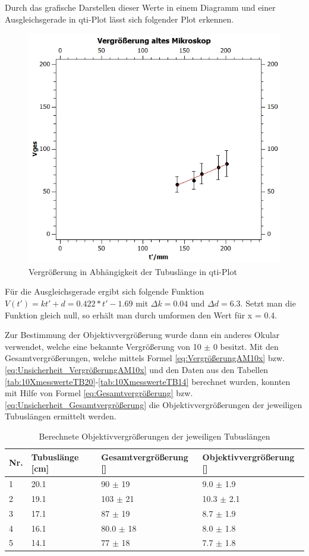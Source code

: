 \documentclass[12pt,a4paper,twoside]{article}
\begin{document}
\noindent
Durch das grafische Darstellen dieser Werte in einem Diagramm und einer Ausgleichsgerade in qti-Plot lässt sich folgender Plot erkennen.

\begin{figure}[H]
    \centering
    \includegraphics[width=0.6\linewidth, angle=0]{nudes/VergrößerungAltesMik.jpg}
    \caption{Vergrößerung in Abhängigkeit der Tubuslänge in qti-Plot}
    \label{fig:VergrößerungDiagramm}
\end{figure}

\noindent
Für die Ausgleichsgerade ergibt sich folgende Funktion $V(t') = kt' + d = 0.422*t' - 1.69$ mit $\Delta k = 0.04$ und $\Delta d = 6.3$. Setzt man die Funktion gleich null, so erhält man durch umformen den Wert für x = 0.4. \newline

\noindent 
Zur Bestimmung der Objektivvergrößerung wurde dann ein anderes Okular verwendet, welche eine bekannte Vergrößerung von 10 $\pm$ 0 besitzt. 
Mit den Gesamtvergrößerungen, welche mittels Formel \ref{eq:VergrößerungAM10x} bzw. \ref{eq:Unsicherheit_VergrößerungAM10x} und den Daten aus den Tabellen \ref{tab:10XmesswerteTB20}-\ref{tab:10XmesswerteTB14} berechnet wurden, konnten mit Hilfe von Formel \ref*{eq:Gesamtvergrößerung} bzw. \ref{eq:Unsicherheit_Gesamtvergrößerung} die Objektivvergrößerungen der jeweiligen Tubuslängen ermittelt werden.

\begin{table}[H]
    \centering
    \caption{Berechnete Objektivvergrößerungen der jeweiligen Tubuslängen}
    \label{tab:Objektivvergrößerungen}
    \begin{tabular}{| l | l | l | l |}
        \hline
        Nr.   & Tubuslänge [cm]  & Gesamtvergrößerung [] & Objektivvergrößerung [] \\
        \hline
        1 & 20.1 & 90 $\pm$ 19 & 9.0 $\pm$ 1.9 \\
        2 & 19.1 & 103 $\pm$ 21 & 10.3 $\pm$ 2.1 \\
        3 & 17.1 & 87 $\pm$ 19 & 8.7 $\pm$ 1.9 \\
        4 & 16.1 & 80.0 $\pm$ 18 & 8.0 $\pm$ 1.8 \\
        5 & 14.1 & 77 $\pm$ 18 & 7.7 $\pm$ 1.8 \\
        \hline
    \end{tabular}
\end{table}
\end{document}
